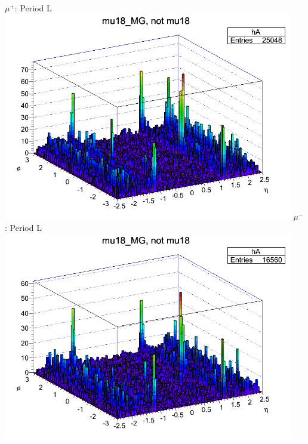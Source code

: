  {
\colb[T]
$\mu^+$: Period L
\centering
\includegraphics[width=0.95\textwidth]{dates/20130306/figures/mu18/dump_MG_dataL_w_POS.dat__MG_NOT_MUID.png}
$\mu^-$: Period L
\centering
\includegraphics[width=0.95\textwidth]{dates/20130306/figures/mu18/dump_MG_dataL_w_NEG.dat__MG_NOT_MUID.png}
\cole
}
